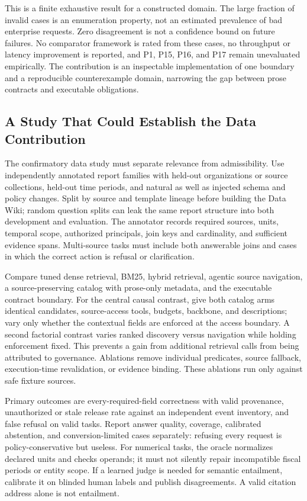 This is a finite exhaustive result for a constructed domain. The large fraction of invalid cases is an enumeration property, not an estimated prevalence of bad enterprise requests. Zero disagreement is not a confidence bound on future failures. No comparator framework is rated from these cases, no throughput or latency improvement is reported, and P1, P15, P16, and P17 remain unevaluated empirically. The contribution is an inspectable implementation of one boundary and a reproducible counterexample domain, narrowing the gap between prose contracts and executable obligations.

\subsection{A Study That Could Establish the Data Contribution}
\label{sec:data-study}

The confirmatory data study must separate relevance from admissibility. Use independently annotated report families with held-out organizations or source collections, held-out time periods, and natural as well as injected schema and policy changes. Split by source and template lineage before building the Data Wiki; random question splits can leak the same report structure into both development and evaluation. The annotator records required sources, units, temporal scope, authorized principals, join keys and cardinality, and sufficient evidence spans. Multi-source tasks must include both answerable joins and cases in which the correct action is refusal or clarification.

Compare tuned dense retrieval, BM25, hybrid retrieval, agentic source navigation, a source-preserving catalog with prose-only metadata, and the executable contract boundary. For the central causal contrast, give both catalog arms identical candidates, source-access tools, budgets, backbone, and descriptions; vary only whether the contextual fields are enforced at the access boundary. A second factorial contrast varies ranked discovery versus navigation while holding enforcement fixed. This prevents a gain from additional retrieval calls from being attributed to governance. Ablations remove individual predicates, source fallback, execution-time revalidation, or evidence binding. These ablations run only against safe fixture sources.

Primary outcomes are every-required-field correctness with valid provenance, unauthorized or stale release rate against an independent event inventory, and false refusal on valid tasks. Report answer quality, coverage, calibrated abstention, and conversion-limited cases separately: refusing every request is policy-conservative but useless. For numerical tasks, the oracle normalizes declared units and checks operands; it must not silently repair incompatible fiscal periods or entity scope. If a learned judge is needed for semantic entailment, calibrate it on blinded human labels and publish disagreements. A valid citation address alone is not entailment.


